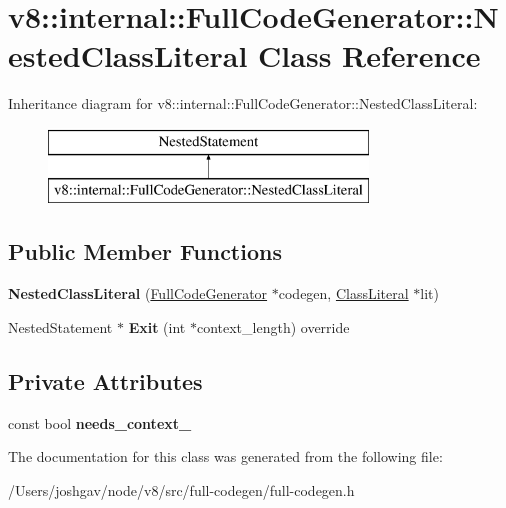 \hypertarget{classv8_1_1internal_1_1_full_code_generator_1_1_nested_class_literal}{}\section{v8\+:\+:internal\+:\+:Full\+Code\+Generator\+:\+:Nested\+Class\+Literal Class Reference}
\label{classv8_1_1internal_1_1_full_code_generator_1_1_nested_class_literal}
Inheritance diagram for v8\+:\+:internal\+:\+:Full\+Code\+Generator\+:\+:Nested\+Class\+Literal\+:\begin{figure}[H]
\begin{center}
\leavevmode
\includegraphics[height=2.000000cm]{classv8_1_1internal_1_1_full_code_generator_1_1_nested_class_literal}
\end{center}
\end{figure}
\subsection*{Public Member Functions}
\begin{DoxyCompactItemize}
\item 
{\bfseries Nested\+Class\+Literal} (\hyperlink{classv8_1_1internal_1_1_full_code_generator}{Full\+Code\+Generator} $\ast$codegen, \hyperlink{classv8_1_1internal_1_1_class_literal}{Class\+Literal} $\ast$lit)\hypertarget{classv8_1_1internal_1_1_full_code_generator_1_1_nested_class_literal_a1a41014c4aa6dc8c7f27ec799a3c7a56}{}\label{classv8_1_1internal_1_1_full_code_generator_1_1_nested_class_literal_a1a41014c4aa6dc8c7f27ec799a3c7a56}

\item 
Nested\+Statement $\ast$ {\bfseries Exit} (int $\ast$context\+\_\+length) override\hypertarget{classv8_1_1internal_1_1_full_code_generator_1_1_nested_class_literal_a91d15e4005ac90f68acd7f2cabb75948}{}\label{classv8_1_1internal_1_1_full_code_generator_1_1_nested_class_literal_a91d15e4005ac90f68acd7f2cabb75948}

\end{DoxyCompactItemize}
\subsection*{Private Attributes}
\begin{DoxyCompactItemize}
\item 
const bool {\bfseries needs\+\_\+context\+\_\+}\hypertarget{classv8_1_1internal_1_1_full_code_generator_1_1_nested_class_literal_a0fe5034859d4c80b1e7f16c4346ecdec}{}\label{classv8_1_1internal_1_1_full_code_generator_1_1_nested_class_literal_a0fe5034859d4c80b1e7f16c4346ecdec}

\end{DoxyCompactItemize}


The documentation for this class was generated from the following file\+:\begin{DoxyCompactItemize}
\item 
/\+Users/joshgav/node/v8/src/full-\/codegen/full-\/codegen.\+h\end{DoxyCompactItemize}
